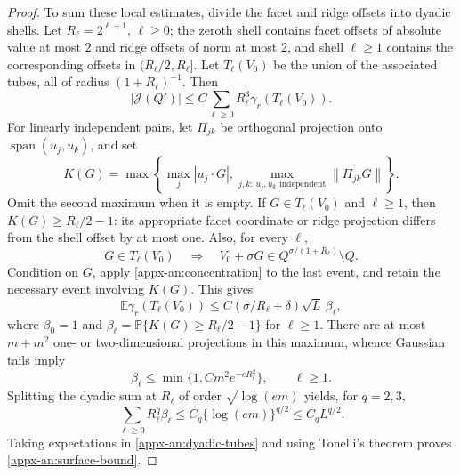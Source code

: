 \documentclass[11pt,letterpaper]{article}
\theoremstyle{remark}
\newcommand{\E}{\mathbb E}
\newcommand{\Pp}{\mathbb P}
\newcommand{\norm}[1]{\left\lVert#1\right\rVert}
\newcommand{\Ga}{\gamma_r}
\newcommand{\surf}{\mathcal J}
\begin{document}
\begin{proof}
To sum these local estimates, divide the facet and ridge offsets into
dyadic shells.  Let \(R_\ell=2^{\ell+1}\),
\(\ell\ge0\); the zeroth shell contains facet offsets of absolute
value at most \(2\) and ridge offsets of norm at most \(2\), and shell
\(\ell\ge1\) contains the corresponding offsets in
\((R_\ell/2,R_\ell]\).  Let \(T_\ell(V_0)\) be the union of the
associated tubes, all of radius \((1+R_\ell)^{-1}\).  Then
\begin{equation}
 |\surf(Q')|\le C\sum_{\ell\ge0}R_\ell^3
                         \Ga(T_\ell(V_0)).
 \label{appx-an:dyadic-tubes}
\end{equation}
For linearly independent pairs, let \(\Pi_{jk}\) be orthogonal
projection onto \(\operatorname{span}(u_j,u_k)\), and set
\[
 K(G)=\max\left\{\max_j|u_j\cdot G|,
   \max_{j,k:\,u_j,u_k\text{ independent}}\norm{\Pi_{jk}G}\right\}.
\]
Omit the second maximum when it is empty.  If
\(G\in T_\ell(V_0)\) and \(\ell\ge1\), then
\(K(G)\ge R_\ell/2-1\): its appropriate facet coordinate or ridge
projection differs from the shell offset by at most one.
Also, for every \(\ell\),
\[
 G\in T_\ell(V_0)
 \quad\Longrightarrow\quad
 V_0+\sigma G\in Q^{\sigma/(1+R_\ell)}\setminus Q.
\]
Condition on \(G\), apply \eqref{appx-an:concentration} to the last event,
and retain the necessary event involving \(K(G)\).  This gives
\[
 \E\Ga(T_\ell(V_0))
 \le C(\sigma/R_\ell+\delta)\sqrt L\,\beta_\ell,
\]
where \(\beta_0=1\) and
\(\beta_\ell=\Pp\{K(G)\ge R_\ell/2-1\}\) for \(\ell\ge1\).
There are at most \(m+m^2\) one- or two-dimensional projections in
this maximum, whence Gaussian tails imply
\[
 \beta_\ell\le\min\{1,Cm^2e^{-cR_\ell^2}\},\qquad \ell\ge1.
\]
Splitting the dyadic sum at \(R_\ell\) of order
\(\sqrt{\log(em)}\) yields, for \(q=2,3\),
\[
 \sum_{\ell\ge0}R_\ell^q\beta_\ell
 \le C_q\{\log(em)\}^{q/2}\le C_qL^{q/2}.
\]
Taking expectations in \eqref{appx-an:dyadic-tubes} and using Tonelli's
theorem proves \eqref{appx-an:surface-bound}.
\end{proof}
\end{document}
